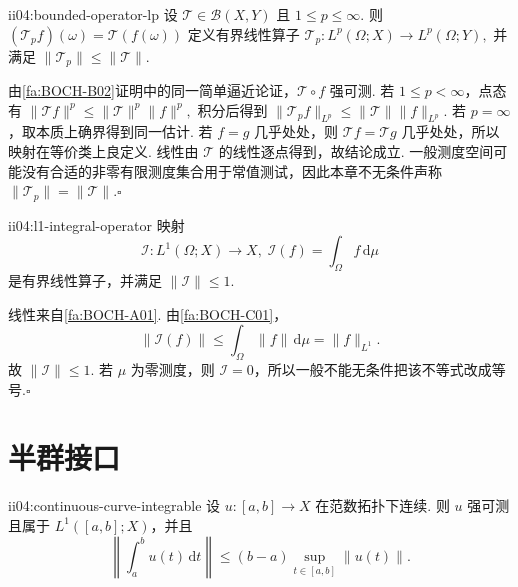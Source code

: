 \begin{FAProposition}{ii04:bounded-operator-lp}
设 \(\displaystyle\mathcal T\in\mathcal B(X,Y)\) 且 \(\displaystyle1\leqslant p\leqslant\infty\). 则
\(\displaystyle (\mathcal T_pf)(\omega)=\mathcal T(f(\omega))\)
定义有界线性算子
\(\displaystyle \mathcal T_p:L^p(\Omega;X)\to L^p(\Omega;Y),\)
并满足
\(\displaystyle \|\mathcal T_p\|\leqslant\|\mathcal T\|.\)
\end{FAProposition}

\begin{FAProof}
由\autoref{fa:BOCH-B02}证明中的同一简单逼近论证，\(\displaystyle\mathcal T\circ f\) 强可测. 若 \(\displaystyle1\leqslant p<\infty\)，点态有
\(\displaystyle \|\mathcal Tf\|^p \leqslant \|\mathcal T\|^p\|f\|^p,\)
积分后得到 \(\displaystyle\|\mathcal T_pf\|_{L^p}\leqslant\|\mathcal T\|\|f\|_{L^p}\). 若 \(\displaystyle p=\infty\)，取本质上确界得到同一估计. 若 \(\displaystyle f=g\) 几乎处处，则 \(\displaystyle\mathcal Tf=\mathcal Tg\) 几乎处处，所以映射在等价类上良定义. 线性由 \(\displaystyle\mathcal T\) 的线性逐点得到，故结论成立. 一般测度空间可能没有合适的非零有限测度集合用于常值测试，因此本章不无条件声称 \(\displaystyle\|\mathcal T_p\|=\|\mathcal T\|\).\hfill\(\square\)
\end{FAProof}

\begin{FAProposition}{ii04:l1-integral-operator}
映射
\[
\mathcal I:L^1(\Omega;X)\to X,\;
\mathcal I(f)=\int_\Omega f\,\mathrm{d}\mu
\]
是有界线性算子，并满足 \(\displaystyle\|\mathcal I\|\leqslant1\).
\end{FAProposition}

\begin{FAProof}
线性来自\autoref{fa:BOCH-A01}. 由\autoref{fa:BOCH-C01}，
\[
\|\mathcal I(f)\|
\leqslant
\int_\Omega\|f\|\,\mathrm{d}\mu
=
\|f\|_{L^1}.
\]
故 \(\displaystyle\|\mathcal I\|\leqslant1\). 若 \(\displaystyle\mu\) 为零测度，则 \(\displaystyle\mathcal I=0\)，所以一般不能无条件把该不等式改成等号.\hfill\(\square\)
\end{FAProof}

\section{半群接口}\label{sec:ii04-semigroup-interface}

\begin{FATheorem}[C][连续Banach值曲线的Bochner可积性]{ii04:continuous-curve-integrable}
设 \(\displaystyle u:[a,b]\to X\) 在范数拓扑下连续. 则 \(\displaystyle u\) 强可测且属于 \(\displaystyle L^1([a,b];X)\)，并且
\[
\left\|\int_a^bu(t)\,\mathrm{d}t\right\|
\leqslant
(b-a)\sup_{t\in[a,b]}\|u(t)\|.
\]
\end{FATheorem}

